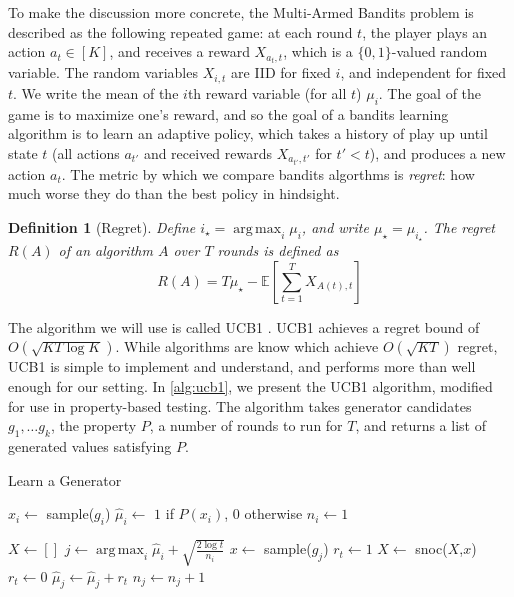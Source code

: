 \documentclass[10pt,a4paper]{article}
\newtheorem{definition}{Definition}
\DeclareMathOperator*{\argmax}{arg\,max}
\begin{document}
To make the discussion more concrete, the Multi-Armed Bandits problem is described as the following repeated game: at each round $t$, the player plays an action $a_t \in [K]$, and receives a reward $X_{{a_t},t}$, which is a $\{0,1\}$-valued random variable. The random variables $X_{i,t}$ are IID for fixed $i$, and independent for fixed $t$. We write the mean of the $i$th reward variable (for all $t$) $\mu_i$. The goal of the game is to maximize one's reward, and so the goal of a bandits learning algorithm is to learn an adaptive policy, which takes a history of play up until state $t$ (all actions $a_{t'}$ and received rewards $X_{a_{t'},t'}$ for $t' < t$), and produces a new action $a_t$. The metric by which we compare bandits algorthms is \textit{regret}: how much worse they do than the best policy in hindsight.

\begin{definition}[Regret]
Define $i_\star = \argmax_i \mu_i$, and write $\mu_\star = \mu_{i_\star}$. The regret $R(A)$ of an algorithm $A$ over $T$ rounds is defined as
$$
R(A) = T\mu_\star - \mathbb{E}\left[\sum_{t=1}^T X_{A(t),t}\right]
$$
\end{definition}

The algorithm we will use is called UCB1 \cite{auer2002finite}. UCB1 achieves a regret bound of $O(\sqrt{KT\log K})$. While algorithms are know which achieve $O(\sqrt{KT})$ regret, UCB1 is simple to implement and understand, and performs more than well enough for our setting. In \autoref{alg:ucb1}, we present the UCB1 algorithm, modified for use in property-based testing. The algorithm takes generator candidates $g_1,\dots g_k$, the property $P$, a number of rounds to run for $T$, and returns a list of generated values satisfying $P$.

\begin{algorithm}
    \caption{Learn a Generator}
    \label{alg:ucb1}
    \begin{algorithmic}
      \State $x_i \gets $ sample($g_i$)
      \State $\hat{\mu}_i \gets$ $1$ if $P(x_i)$, $0$ otherwise
      \State $n_i \gets 1$

      \EndFor
      \State $X \gets []$
        \State $j \gets \argmax_i \hat{\mu}_i + \sqrt{\frac{2\log t}{n_i}}$
        \State $x \gets$ sample($g_j$)
          \State $r_t \gets 1$
          \State $X \gets$ snoc($X$,$x$)
        \Else
          \State $r_t \gets 0$
        \EndIf
        \State $\hat{\mu}_j \gets \hat{\mu}_j + r_t$
        \State $n_j \gets n_j + 1$
      \EndFor
      \EndFunction
    \end{algorithmic}
\end{algorithm}
\end{document}
